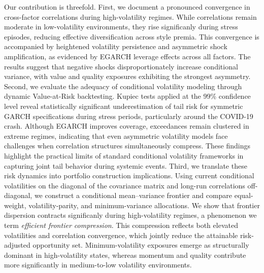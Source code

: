 \documentclass{article}
\begin{document}
Our contribution is threefold. First, we document a pronounced convergence in cross-factor correlations during high-volatility regimes. While correlations remain moderate in low-volatility environments, they rise significanly during stress episodes, reducing effective diversification across style premia. This convergence is accompanied by heightened volatility persistence and asymmetric shock amplification, as evidenced by EGARCH leverage effects across all factors. The results suggest that negative shocks disproportionately increase conditional variance, with value and quality exposures exhibiting the strongest asymmetry. Second, we evaluate the adequacy of conditional volatility modeling through dynamic Value-at-Risk backtesting. Kupiec tests applied at the 99\% confidence level reveal statistically significant underestimation of tail risk for symmetric GARCH specifications during stress periods, particularly around the COVID-19 crash. Although EGARCH improves coverage, exceedances remain clustered in extreme regimes, indicating that even asymmetric volatility models face challenges when correlation structures simultaneously compress. These findings highlight the practical limits of standard conditional volatility frameworks in capturing joint tail behavior during systemic events. Third, we translate these risk dynamics into portfolio construction implications. Using current conditional volatilities on the diagonal of the covariance matrix and long-run correlations off-diagonal, we construct a conditional mean–variance frontier and compare equal-weight, volatility-parity, and minimum-variance allocations. We show that frontier dispersion contracts significanly during high-volatility regimes, a phenomenon we term \emph{efficient frontier compression}. This compression reflects both elevated volatilities and correlation convergence, which jointly reduce the attainable risk-adjusted opportunity set. Minimum-volatility exposures emerge as structurally dominant in high-volatility states, whereas momentum and quality contribute more significantly in medium-to-low volatility environments.\newline
\end{document}
